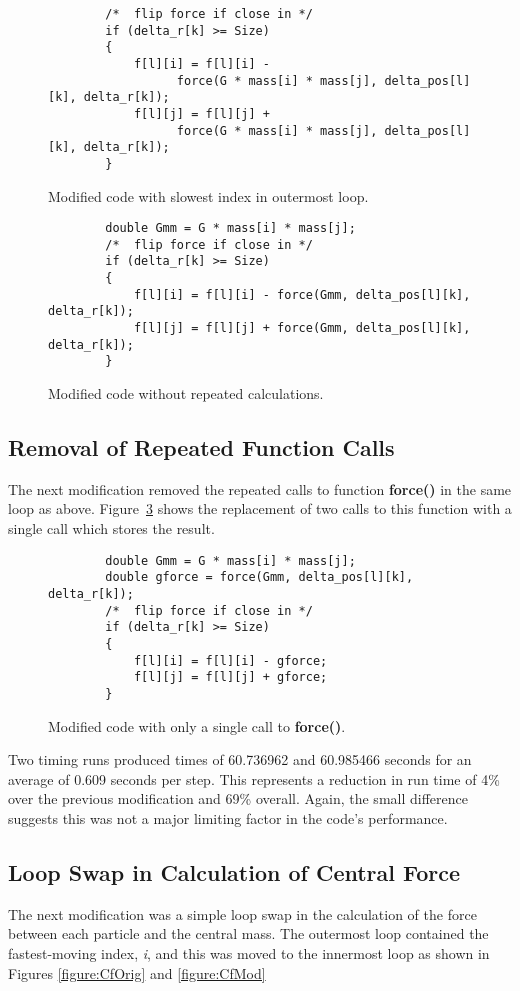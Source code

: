 \documentclass[11pt, oneside]{article}   %
\begin{document}
\begin{figure}
	\begin{lstlisting}
		/*  flip force if close in */
		if (delta_r[k] >= Size)
		{
			f[l][i] = f[l][i] -
				  force(G * mass[i] * mass[j], delta_pos[l][k], delta_r[k]);
			f[l][j] = f[l][j] +
				  force(G * mass[i] * mass[j], delta_pos[l][k], delta_r[k]);
		}
	\end{lstlisting}
	\caption{Modified code with slowest index in outermost loop.}
	\label{figure:GmmOrig}
\end{figure}

\begin{figure}
	\begin{lstlisting}
		double Gmm = G * mass[i] * mass[j];
		/*  flip force if close in */
		if (delta_r[k] >= Size)
		{
			f[l][i] = f[l][i] - force(Gmm, delta_pos[l][k], delta_r[k]);
			f[l][j] = f[l][j] + force(Gmm, delta_pos[l][k], delta_r[k]);
		}
	\end{lstlisting}
	\caption{Modified code without repeated calculations.}
	\label{figure:GmmMod}
\end{figure}

\subsection{Removal of Repeated Function Calls}
The next modification removed the repeated calls to function \textbf{force()} in the same loop as above.
Figure~\ref{figure:ForceMod} shows the replacement of two calls to this function with a single call which stores the result.

\begin{figure}
	\begin{lstlisting}
		double Gmm = G * mass[i] * mass[j];
		double gforce = force(Gmm, delta_pos[l][k], delta_r[k]);
		/*  flip force if close in */
		if (delta_r[k] >= Size)
		{
			f[l][i] = f[l][i] - gforce;
			f[l][j] = f[l][j] + gforce;
		}
	\end{lstlisting}
	\caption{Modified code with only a single call to \textbf{force()}.}
	\label{figure:ForceMod}
\end{figure}

Two timing runs produced times of 60.736962 and 60.985466 seconds for an average of 0.609 seconds per step.
This represents a reduction in run time of 4\% over the previous modification and 69\% overall.
Again, the small difference suggests this was not a major limiting factor in the code's performance.

\subsection{Loop Swap in Calculation of Central Force}
The next modification was a simple loop swap in the calculation of the force between each particle and the central mass.
The outermost loop contained the fastest-moving index, {\em i}, and this was moved to the innermost loop as shown in Figures \ref{figure:CfOrig} and \ref{figure:CfMod}
\end{document}
